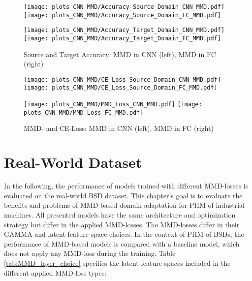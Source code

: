 \begin{figure}[htp]
  \centering
  \texttt{[image: plots\_CNN\_MMD/Accuracy\_Source\_Domain\_CNN\_MMD.pdf]}
  \hspace{.3cm}
  \texttt{[image: plots\_CNN\_MMD/Accuracy\_Source\_Domain\_FC\_MMD.pdf]}

  \vspace{.1cm}

  \texttt{[image: plots\_CNN\_MMD/Accuracy\_Target\_Domain\_CNN\_MMD.pdf]}
  \hspace{.3cm}
  \texttt{[image: plots\_CNN\_MMD/Accuracy\_Target\_Domain\_FC\_MMD.pdf]}

  \caption{Source and Target Accuracy: MMD in CNN (left), MMD in FC (right)}
  \label{fig:accuracy_cnn_and_no_cnn_mmd}
\end{figure}

\begin{figure}[H]
  \centering
  \texttt{[image: plots\_CNN\_MMD/CE\_Loss\_Source\_Domain\_CNN\_MMD.pdf]}
  \hspace{.3cm}
  \texttt{[image: plots\_CNN\_MMD/CE\_Loss\_Source\_Domain\_FC\_MMD.pdf]}

  \vspace{.1cm}

  \texttt{[image: plots\_CNN\_MMD/MMD\_Loss\_CNN\_MMD.pdf]}
  \hspace{.1cm}
  \texttt{[image: plots\_CNN\_MMD/MMD\_Loss\_FC\_MMD.pdf]}

  \caption{MMD- and CE-Loss: MMD in CNN (left), MMD in FC (right)}
  \label{fig:loss_cnn_and_no_cnn_mmd}
\end{figure}

\section{Real-World Dataset}
In the following, the performance of models trained with different MMD-losses is evaluated on the real-world BSD dataset. This chapter's goal is to evaluate the benefits and problems of MMD-based domain adaptation for PHM of industrial machines. All presented models have the same architecture and optimization strategy but differ in the applied MMD-losses. The MMD-losses differ in their GAMMA and latent feature space choices. In the context of PHM of BSDs, the performance of MMD-based models is compared with a baseline model, which does not apply any MMD-loss during the training. Table \ref{tab:MMD_layer_choice}  specifies the latent feature spaces included in the different applied MMD-loss types:

